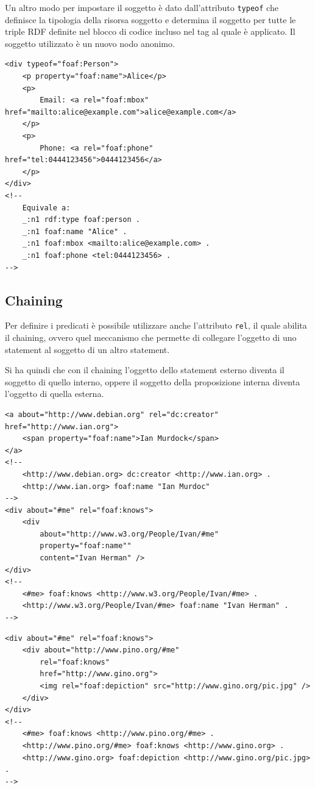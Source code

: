 Un altro modo per impostare il soggetto è dato dall'attributo \texttt{typeof} che definisce la tipologia della risorsa soggetto e determina il soggetto per tutte le triple RDF definite nel blocco di codice incluso nel tag al quale è applicato. Il soggetto utilizzato è un nuovo nodo anonimo.

\begin{lstlisting}[language=RDFA, caption=Utilizzo di typeof]
<div typeof="foaf:Person">
	<p property="foaf:name">Alice</p> 
	<p>
		Email: <a rel="foaf:mbox" href="mailto:alice@example.com">alice@example.com</a>
	</p>
	<p>
		Phone: <a rel="foaf:phone" href="tel:0444123456">0444123456</a>
	</p>
</div>
<!--
	Equivale a:
	_:n1 rdf:type foaf:person .
	_:n1 foaf:name "Alice" .
	_:n1 foaf:mbox <mailto:alice@example.com> .
	_:n1 foaf:phone <tel:0444123456> .
-->
\end{lstlisting}

\subsection{Chaining}

Per definire i predicati è possibile utilizzare anche l'attributo \texttt{rel}, il quale abilita il chaining, ovvero quel meccanismo che permette di collegare l'oggetto di uno statement al soggetto di un altro statement.

Si ha quindi che con il chaining l'oggetto dello statement esterno diventa il soggetto di quello interno, oppere il soggetto della proposizione interna diventa l'oggetto di quella esterna.

\begin{lstlisting}[language=RDFA, caption=Esempi di chaining]
<a about="http://www.debian.org" rel="dc:creator" href="http://www.ian.org">
	<span property="foaf:name">Ian Murdock</span>
</a>
<!--
	<http://www.debian.org> dc:creator <http://www.ian.org> .
	<http://www.ian.org> foaf:name "Ian Murdoc"
-->
<div about="#me" rel="foaf:knows">
	<div 
		about="http://www.w3.org/People/Ivan/#me"
		property="foaf:name""
		content="Ivan Herman" />
</div>
<!--
	<#me> foaf:knows <http://www.w3.org/People/Ivan/#me> .
	<http://www.w3.org/People/Ivan/#me> foaf:name "Ivan Herman" .
-->
\end{lstlisting}

\begin{lstlisting}[language=RDFA, caption=Io conosco pino che conosce gino che ha una determinata foto]
<div about="#me" rel="foaf:knows">
	<div about="http://www.pino.org/#me"
		rel="foaf:knows"
		href="http://www.gino.org">
		<img rel="foaf:depiction" src="http://www.gino.org/pic.jpg" />
	</div>
</div>
<!-- 
	<#me> foaf:knows <http://www.pino.org/#me> .
	<http://www.pino.org/#me> foaf:knows <http://www.gino.org> .
	<http://www.gino.org> foaf:depiction <http://www.gino.org/pic.jpg> .
-->
\end{lstlisting}

